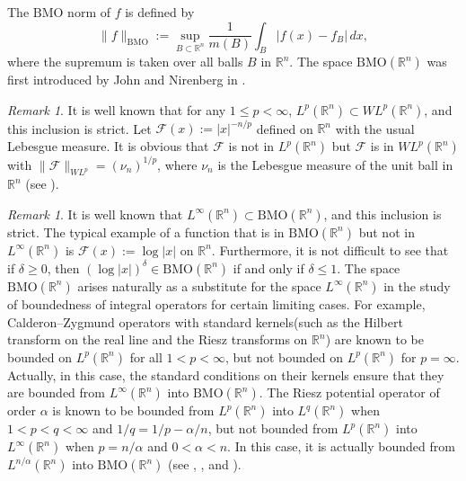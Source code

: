 \documentclass{birkjour}
\theoremstyle{definition}
\theoremstyle{remark}
\newtheorem{rem}[thm]{Remark}
\numberwithin{equation}{section}
\begin{document}
The $\mathrm{BMO}$ norm of $f$ is defined by
\begin{equation*}
\|f\|_{\mathrm{BMO}}:=\sup_{B\subset\mathbb R^n}\frac{1}{m(B)}\int_{B}|f(x)-f_{B}|\,dx,
\end{equation*}
where the supremum is taken over all balls $B$ in $\mathbb R^n$. The space $\mathrm{BMO}(\mathbb R^n)$ was first introduced by John and Nirenberg in \cite{john}.
\begin{rem}
It is well known that for any $1\leq p<\infty$, $L^p(\mathbb R^n)\subset WL^{p}(\mathbb R^n)$, and this inclusion is strict. Let $\mathcal{F}(x):=|x|^{-n/p}$ defined on $\mathbb R^n$ with the usual Lebesgue measure. It is obvious that $\mathcal{F}$ is not in $L^p(\mathbb R^n)$ but $\mathcal{F}$ is in $WL^{p}(\mathbb R^n)$ with $\|\mathcal{F}\|_{WL^{p}}=(\nu_n)^{1/p}$, where $\nu_n$ is the Lebesgue measure of the unit ball in $\mathbb R^n$ (see \cite{Grafakos2}).
\end{rem}

\begin{rem}
It is well known that $L^\infty(\mathbb R^n)\subset \mathrm{BMO}(\mathbb R^n)$, and this inclusion is strict. The typical example of a function that is in $\mathrm{BMO}(\mathbb R^n)$ but not in $L^\infty(\mathbb R^n)$ is $\mathcal{F}(x):=\log |x|$ on $\mathbb R^n$. Furthermore, it is not difficult to see that if $\delta\geq0$, then $(\log|x|)^{\delta}\in \mathrm{BMO}(\mathbb R^n)$ if and only if $\delta\leq1$. The space $\mathrm{BMO}(\mathbb R^n)$ arises naturally as a substitute for the space $L^\infty(\mathbb R^n)$ in the study of boundedness of integral operators for certain limiting cases. For example, Calderon--Zygmund operators with standard kernels(such as the Hilbert transform on the real line and the Riesz transforms on $\mathbb R^n$) are known to be bounded on $L^p(\mathbb R^n)$ for all $1<p<\infty$, but not bounded on $L^p(\mathbb R^n)$ for $p=\infty$. Actually, in this case, the standard conditions on their kernels ensure that they are bounded from $L^\infty(\mathbb R^n)$ into $\mathrm{BMO}(\mathbb R^n)$. The Riesz potential operator of order $\alpha$ is known to be bounded from $L^p(\mathbb R^n)$ into $L^q(\mathbb R^n)$ when $1<p<q<\infty$ and $1/q=1/p-\alpha/n$, but not bounded from $L^p(\mathbb R^n)$ into $L^{\infty}(\mathbb R^n)$ when $p=n/{\alpha}$ and $0<\alpha<n$. In this case, it is actually bounded from $L^{n/{\alpha}}(\mathbb R^n)$ into $\mathrm{BMO}(\mathbb R^n)$ (see \cite{duoand}, \cite{Grafakos}, \cite{stein} and \cite{stein2}).
\end{rem}
\end{document}
